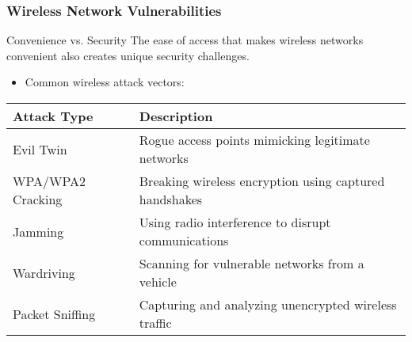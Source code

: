 \documentclass{beamer}
\begin{document}
\begin{frame}
    \frametitle{Wireless Network Vulnerabilities}
    
    \begin{block}{Convenience vs. Security}
        The ease of access that makes wireless networks convenient also creates unique security challenges.
    \end{block}
    
    \begin{itemize}
        \item Common wireless attack vectors:
    \end{itemize}
    
    \begin{table}
        \centering
        \begin{tabular}{l|l}
            \textbf{Attack Type} & \textbf{Description} \\
            \hline
            Evil Twin & Rogue access points mimicking legitimate networks \\
            WPA/WPA2 Cracking & Breaking wireless encryption using captured handshakes \\
            Jamming & Using radio interference to disrupt communications \\
            Wardriving & Scanning for vulnerable networks from a vehicle \\
            Packet Sniffing & Capturing and analyzing unencrypted wireless traffic \\
        \end{tabular}
    \end{table}
  
\end{frame}
\end{document}

